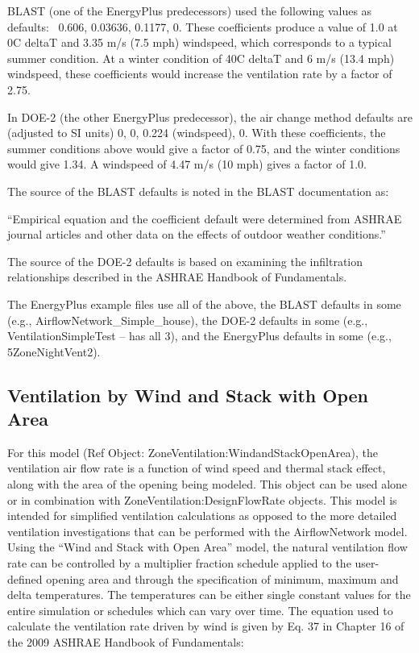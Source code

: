 BLAST (one of the EnergyPlus predecessors) used the following values as defaults:~ 0.606, 0.03636, 0.1177, 0. These coefficients produce a value of 1.0 at 0C deltaT and 3.35 m/s (7.5 mph) windspeed, which corresponds to a typical summer condition. At a winter condition of 40C deltaT and 6 m/s (13.4 mph) windspeed, these coefficients would increase the ventilation rate by a factor of 2.75.

In DOE-2 (the other EnergyPlus predecessor), the air change method defaults are (adjusted to SI units) 0, 0, 0.224 (windspeed), 0. With these coefficients, the summer conditions above would give a factor of 0.75, and the winter conditions would give 1.34. A windspeed of 4.47 m/s (10 mph) gives a factor of 1.0.

The source of the BLAST defaults is noted in the BLAST documentation as:

``Empirical equation and the coefficient default were determined from ASHRAE journal articles and other data on the effects of outdoor weather conditions.''

The source of the DOE-2 defaults is based on examining the infiltration relationships described in the ASHRAE Handbook of Fundamentals.

The EnergyPlus example files use all of the above, the BLAST defaults in some (e.g., AirflowNetwork\_Simple\_house), the DOE-2 defaults in some (e.g., VentilationSimpleTest -- has all 3), and the EnergyPlus defaults in some (e.g., 5ZoneNightVent2).

\subsection{Ventilation by Wind and Stack with Open Area}\label{ventilation-by-wind-and-stack-with-open-area}

For this model (Ref Object: ZoneVentilation:WindandStackOpenArea), the ventilation air flow rate is a function of wind speed and thermal stack effect, along with the area of the opening being modeled. This object can be used alone or in combination with ZoneVentilation:DesignFlowRate objects. This model is intended for simplified ventilation calculations as opposed to the more detailed ventilation investigations that can be performed with the AirflowNetwork model. Using the ``Wind and Stack with Open Area'' model, the natural ventilation flow rate can be controlled by a multiplier fraction schedule applied to the user-defined opening area and through the specification of minimum, maximum and delta temperatures. The temperatures can be either single constant values for the entire simulation or schedules which can vary over time. The equation used to calculate the ventilation rate driven by wind is given by Eq. 37 in Chapter 16 of the 2009 ASHRAE Handbook of Fundamentals:

